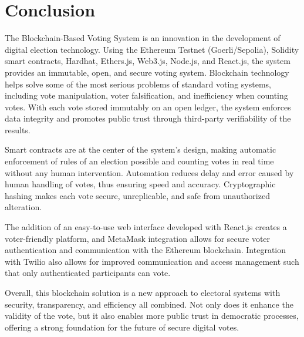\documentclass[conference]{IEEEtran}
\begin{document}
\section{Conclusion}
The Blockchain-Based Voting System is an innovation in the development of digital election technology. Using the Ethereum Testnet (Goerli/Sepolia), Solidity smart contracts, Hardhat, Ethers.js, Web3.js, Node.js, and React.js, the system provides an immutable, open, and secure voting system. Blockchain technology helps solve some of the most serious problems of standard voting systems, including vote manipulation, voter falsification, and inefficiency when counting votes. With each vote stored immutably on an open ledger, the system enforces data integrity and promotes public trust through third-party verifiability of the results.

Smart contracts are at the center of the system's design, making automatic enforcement of rules of an election possible and counting votes in real time without any human intervention. Automation reduces delay and error caused by human handling of votes, thus ensuring speed and accuracy. Cryptographic hashing makes each vote secure, unreplicable, and safe from unauthorized alteration.

The addition of an easy-to-use web interface developed with React.js creates a voter-friendly platform, and MetaMask integration allows for secure voter authentication and communication with the Ethereum blockchain. Integration with Twilio also allows for improved communication and access management such that only authenticated participants can vote.

Overall, this blockchain solution is a new approach to electoral systems with security, transparency, and efficiency all combined. Not only does it enhance the validity of the vote, but it also enables more public trust in democratic processes, offering a strong foundation for the future of secure digital votes.
\end{document}
